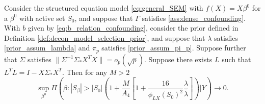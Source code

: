 \documentclass[11pt]{article}
\newcommand{\postCov}{\Sigma_*}
\begin{document}
\begin{theorem}[Dimension]\label{thm:dimension}
		Consider the structured equation model \eqref{eq:general_SEM} with $f(X) = X\beta^0$ for a $\beta^0$ with active set $S_0$, and suppose that $\Gamma$ satisfies \eqref{ass:dense_confounding}. With $b$ given by \eqref{eq:b_relation_confounding}, consider the prior defined in Definition \ref{def:decon_model_selection_prior}, and suppose that {\color{assumption} $\lambda$ satisfies \eqref{prior_assum_lambda} and $\pi_p$ satisfies \eqref{prior_assum_pi_p}}. Suppose further that $\Sigma$ satisfies {\color{assumption}$\|\Sigma^{-1} \postCov X^TX\| = o_p(\sqrt{p})$}. Suppose there exists $L$ such that $L^TL = I - X\postCov X^T$.
Then for any $M > 2$
$$
	\sup_{\beta^0} \Pi\left(\beta: |S_\beta| > |S_0|\left(1 + \frac{M}{A_4}\left[1 + \frac{16}{\phi_{LX}(S_0)^2}\frac{\lambda}{\bar{\lambda}} \right]\right) | Y \right) \rightarrow 0.
$$
\end{theorem}
\end{document}
